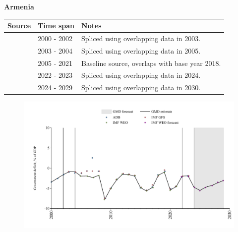 \documentclass[12pt,a4paper,landscape]{article}
\begin{document}
\begin{adjustbox}{max totalsize={\paperwidth}{\paperheight},center}
\begin{minipage}[t][\textheight][t]{\textwidth}
\vspace*{0.5cm}
{}
\begin{center}
{\Large\bfseries Armenia}
\end{center}
\vspace{0.5cm}
\begin{table}[H]
\centering
\small
\begin{tabular}{|l|l|l|}
\hline
\textbf{Source} & \textbf{Time span} & \textbf{Notes} \\
\hline
\rowcolor{white}\cite{ADB}& 2000 - 2002 &Spliced using overlapping data in 2003.\\
\rowcolor{lightgray}\cite{IMF_GFS}& 2003 - 2004 &Spliced using overlapping data in 2005.\\
\rowcolor{white}\cite{IMF_WEO}& 2005 - 2021 &Baseline source, overlaps with base year 2018.\\
\rowcolor{lightgray}\cite{IMF_GFS}& 2022 - 2023 &Spliced using overlapping data in 2024.\\
\rowcolor{white}\cite{IMF_WEO_forecast}& 2024 - 2029 &Spliced using overlapping data in 2030.\\
\hline
\end{tabular}
\end{table}
\begin{figure}[H]
\centering
\includegraphics[width=\textwidth,height=0.6\textheight,keepaspectratio]{graphs/ARM_govdef_GDP.pdf}
\end{figure}
\end{minipage}
\end{adjustbox}
\end{document}
